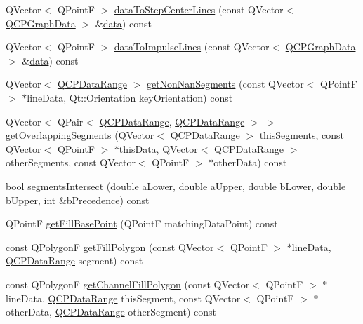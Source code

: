 \begin{DoxyCompactItemize}
\item 
Q\+Vector$<$ Q\+PointF $>$ \mbox{\hyperlink{class_q_c_p_graph_a238116f1898c49cb8209d61707b5b367}{data\+To\+Step\+Center\+Lines}} (const Q\+Vector$<$ \mbox{\hyperlink{class_q_c_p_graph_data}{Q\+C\+P\+Graph\+Data}} $>$ \&\mbox{\hyperlink{class_q_c_p_graph_a141aa31a1f19bbd0ce60f55eaeb9ea60}{data}}) const
\item 
Q\+Vector$<$ Q\+PointF $>$ \mbox{\hyperlink{class_q_c_p_graph_a2a958a5c6a6e1e4a03556be88b6fe37e}{data\+To\+Impulse\+Lines}} (const Q\+Vector$<$ \mbox{\hyperlink{class_q_c_p_graph_data}{Q\+C\+P\+Graph\+Data}} $>$ \&\mbox{\hyperlink{class_q_c_p_graph_a141aa31a1f19bbd0ce60f55eaeb9ea60}{data}}) const
\item 
Q\+Vector$<$ \mbox{\hyperlink{class_q_c_p_data_range}{Q\+C\+P\+Data\+Range}} $>$ \mbox{\hyperlink{class_q_c_p_graph_a0e0886b9ec7731d8993bbb104465f3b9}{get\+Non\+Nan\+Segments}} (const Q\+Vector$<$ Q\+PointF $>$ $\ast$line\+Data, Qt\+::\+Orientation key\+Orientation) const
\item 
Q\+Vector$<$ Q\+Pair$<$ \mbox{\hyperlink{class_q_c_p_data_range}{Q\+C\+P\+Data\+Range}}, \mbox{\hyperlink{class_q_c_p_data_range}{Q\+C\+P\+Data\+Range}} $>$ $>$ \mbox{\hyperlink{class_q_c_p_graph_a334b15c43ee1855bf724daf886e8530e}{get\+Overlapping\+Segments}} (Q\+Vector$<$ \mbox{\hyperlink{class_q_c_p_data_range}{Q\+C\+P\+Data\+Range}} $>$ this\+Segments, const Q\+Vector$<$ Q\+PointF $>$ $\ast$this\+Data, Q\+Vector$<$ \mbox{\hyperlink{class_q_c_p_data_range}{Q\+C\+P\+Data\+Range}} $>$ other\+Segments, const Q\+Vector$<$ Q\+PointF $>$ $\ast$other\+Data) const
\item 
bool \mbox{\hyperlink{class_q_c_p_graph_abb9c674b207a1f6df5e083aa9f3e071a}{segments\+Intersect}} (double a\+Lower, double a\+Upper, double b\+Lower, double b\+Upper, int \&b\+Precedence) const
\item 
Q\+PointF \mbox{\hyperlink{class_q_c_p_graph_a13f2c756f3114703159c2e604783e208}{get\+Fill\+Base\+Point}} (Q\+PointF matching\+Data\+Point) const
\item 
const Q\+PolygonF \mbox{\hyperlink{class_q_c_p_graph_af73d5fe97cde966785bfd67201e44391}{get\+Fill\+Polygon}} (const Q\+Vector$<$ Q\+PointF $>$ $\ast$line\+Data, \mbox{\hyperlink{class_q_c_p_data_range}{Q\+C\+P\+Data\+Range}} segment) const
\item 
const Q\+PolygonF \mbox{\hyperlink{class_q_c_p_graph_a9a5bdd5cb695d95d3eea80cfe96c5118}{get\+Channel\+Fill\+Polygon}} (const Q\+Vector$<$ Q\+PointF $>$ $\ast$line\+Data, \mbox{\hyperlink{class_q_c_p_data_range}{Q\+C\+P\+Data\+Range}} this\+Segment, const Q\+Vector$<$ Q\+PointF $>$ $\ast$other\+Data, \mbox{\hyperlink{class_q_c_p_data_range}{Q\+C\+P\+Data\+Range}} other\+Segment) const

\end{DoxyCompactItemize}
